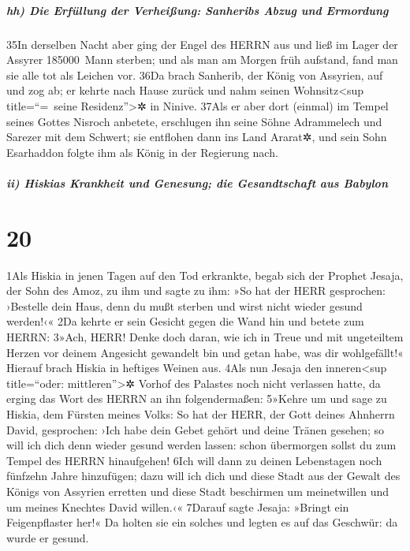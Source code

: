 \hypertarget{hh-die-erfuxfcllung-der-verheiuxdfung-sanheribs-abzug-und-ermordung}{%
\subparagraph{hh) Die Erfüllung der Verheißung: Sanheribs Abzug und
Ermordung}\label{hh-die-erfuxfcllung-der-verheiuxdfung-sanheribs-abzug-und-ermordung}}

35In derselben Nacht aber ging der Engel des HERRN aus und ließ im Lager
der Assyrer 185000~Mann sterben; und als man am Morgen früh aufstand,
fand man sie alle tot als Leichen vor. 36Da brach Sanherib, der König
von Assyrien, auf und zog ab; er kehrte nach Hause zurück und nahm
seinen Wohnsitz\textless sup title=``=~seine Residenz''\textgreater✲ in
Ninive. 37Als er aber dort (einmal) im Tempel seines Gottes Nisroch
anbetete, erschlugen ihn seine Söhne Adrammelech und Sarezer mit dem
Schwert; sie entflohen dann ins Land Ararat✲, und sein Sohn Esarhaddon
folgte ihm als König in der Regierung nach.

\hypertarget{ii-hiskias-krankheit-und-genesung-die-gesandtschaft-aus-babylon}{%
\subparagraph{ii) Hiskias Krankheit und Genesung; die Gesandtschaft aus
Babylon}\label{ii-hiskias-krankheit-und-genesung-die-gesandtschaft-aus-babylon}}

\hypertarget{section-19}{%
\section{20}\label{section-19}}

1Als Hiskia in jenen Tagen auf den Tod erkrankte, begab sich der Prophet
Jesaja, der Sohn des Amoz, zu ihm und sagte zu ihm: »So hat der HERR
gesprochen: ›Bestelle dein Haus, denn du mußt sterben und wirst nicht
wieder gesund werden!‹« 2Da kehrte er sein Gesicht gegen die Wand hin
und betete zum HERRN: 3»Ach, HERR! Denke doch daran, wie ich in Treue
und mit ungeteiltem Herzen vor deinem Angesicht gewandelt bin und getan
habe, was dir wohlgefällt!« Hierauf brach Hiskia in heftiges Weinen aus.
4Als nun Jesaja den inneren\textless sup title=``oder:
mittleren''\textgreater✲ Vorhof des Palastes noch nicht verlassen hatte,
da erging das Wort des HERRN an ihn folgendermaßen: 5»Kehre um und sage
zu Hiskia, dem Fürsten meines Volks: So hat der HERR, der Gott deines
Ahnherrn David, gesprochen: ›Ich habe dein Gebet gehört und deine Tränen
gesehen; so will ich dich denn wieder gesund werden lassen: schon
übermorgen sollst du zum Tempel des HERRN hinaufgehen! 6Ich will dann zu
deinen Lebenstagen noch fünfzehn Jahre hinzufügen; dazu will ich dich
und diese Stadt aus der Gewalt des Königs von Assyrien erretten und
diese Stadt beschirmen um meinetwillen und um meines Knechtes David
willen.‹« 7Darauf sagte Jesaja: »Bringt ein Feigenpflaster her!« Da
holten sie ein solches und legten es auf das Geschwür: da wurde er
gesund.

